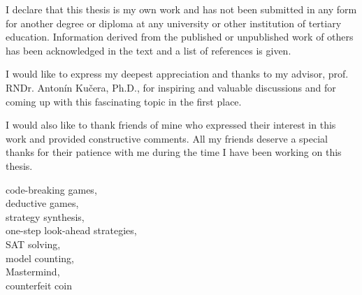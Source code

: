

{}








\FrontMatter
\setlength{\parindent}{0pt}
\ThesisTitlePage


\begin{ThesisDeclaration}
I declare that this thesis is my own work and has not been submitted
in any form for another degree or diploma at any university or
other institution of tertiary education. Information derived from the published
or unpublished work of others has been acknowledged in the text
and a list of references is given.

\AdvisorName
\end{ThesisDeclaration}


\begin{ThesisThanks}
I would like to express my deepest appreciation and thanks to my advisor,
  prof. RNDr. Antonín Kučera, Ph.D.,
  for inspiring and valuable discussions and
  for coming up with this fascinating topic in the first place.

I would also like to thank friends of mine who
  expressed their interest in this work and provided
  constructive comments.
All my friends deserve a special thanks for their patience with me
 during the time I have been working on this thesis.
\end{ThesisThanks}


\begin{ThesisKeyWords}
code-breaking games, \\
deductive games,\\
strategy synthesis, \\
one-step look-ahead strategies,\\
SAT solving,\\
model counting, \\
Mastermind, \\
counterfeit coin\\
\end{ThesisKeyWords}


